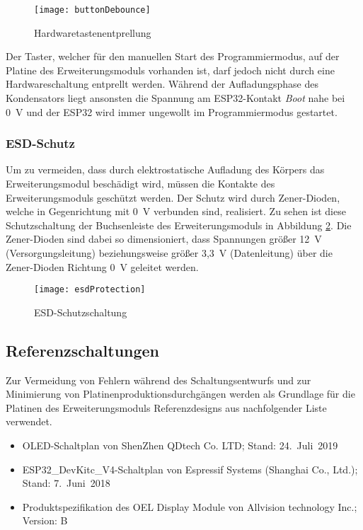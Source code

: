 \begin{figure}[h]
    \centering
    \texttt{[image: buttonDebounce]}
    \caption{Hardwaretastenentprellung}
    \label{fig:buttonDebounce}
\end{figure}

Der Taster, welcher für den manuellen Start des Programmiermodus, auf der Platine des Erweiterungsmoduls vorhanden ist, darf jedoch nicht durch eine Hardwareschaltung entprellt werden.  Während der Aufladungsphase des Kondensators liegt ansonsten die Spannung am ESP32-Kontakt \textit{Boot} nahe bei 0~V und der ESP32 wird immer ungewollt im Programmiermodus gestartet.

\subsubsection{\acf{ESD}-Schutz}
\label{section:esdProtection}
Um zu vermeiden, dass durch elektrostatische Aufladung des Körpers das Erweiterungsmodul beschädigt wird, müssen die Kontakte des Erweiterungsmoduls geschützt werden. Der Schutz wird durch Zener-Dioden, welche in Gegenrichtung mit 0~V verbunden sind, realisiert. Zu sehen ist diese Schutzschaltung der Buchsenleiste des Erweiterungsmoduls in Abbildung \ref{fig:esdProtection}. Die Zener-Dioden sind dabei so dimensioniert, dass Spannungen größer 12~V (Versorgungsleitung) beziehungsweise größer 3,3~V (Datenleitung) über die Zener-Dioden Richtung 0~V geleitet werden.

\begin{figure}[h]
    \centering
    \texttt{[image: esdProtection]}
    \caption{\ac{ESD}-Schutzschaltung}
    \label{fig:esdProtection}
\end{figure}

\subsection{Referenzschaltungen}
Zur Vermeidung von Fehlern während des Schaltungsentwurfs und zur Minimierung von Platinenproduktionsdurchgängen werden als Grundlage für die Platinen des Erweiterungsmoduls Referenzdesigns aus nachfolgender Liste verwendet.

\begin{itemize}
    \item \acs{OLED}-Schaltplan von ShenZhen QDtech Co. LTD; Stand: 24.~Juli~2019
    \item ESP32\_DevKitc\_V4-Schaltplan von Espressif Systems (Shanghai Co., Ltd.); Stand: 7.~Juni~2018
    \item Produktspezifikation des OEL Display Module von Allvision technology Inc.; Version: B
\end{itemize}

